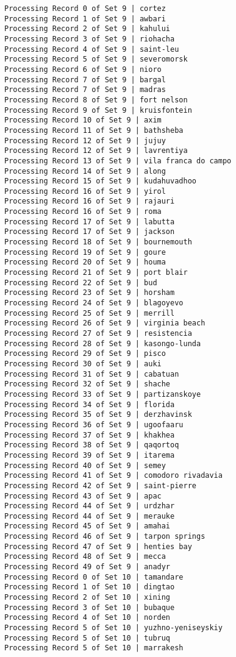 \documentclass[11pt]{article}
\begin{document}
\begin{Verbatim}[commandchars=\\\{\}]
Processing Record 0 of Set 9 | cortez
Processing Record 1 of Set 9 | awbari
Processing Record 2 of Set 9 | kahului
Processing Record 3 of Set 9 | riohacha
Processing Record 4 of Set 9 | saint-leu
Processing Record 5 of Set 9 | severomorsk
Processing Record 6 of Set 9 | nioro
Processing Record 7 of Set 9 | bargal
Processing Record 7 of Set 9 | madras
Processing Record 8 of Set 9 | fort nelson
Processing Record 9 of Set 9 | kruisfontein
Processing Record 10 of Set 9 | axim
Processing Record 11 of Set 9 | bathsheba
Processing Record 12 of Set 9 | jujuy
Processing Record 12 of Set 9 | lavrentiya
Processing Record 13 of Set 9 | vila franca do campo
Processing Record 14 of Set 9 | along
Processing Record 15 of Set 9 | kudahuvadhoo
Processing Record 16 of Set 9 | yirol
Processing Record 16 of Set 9 | rajauri
Processing Record 16 of Set 9 | roma
Processing Record 17 of Set 9 | labutta
Processing Record 17 of Set 9 | jackson
Processing Record 18 of Set 9 | bournemouth
Processing Record 19 of Set 9 | goure
Processing Record 20 of Set 9 | houma
Processing Record 21 of Set 9 | port blair
Processing Record 22 of Set 9 | bud
Processing Record 23 of Set 9 | horsham
Processing Record 24 of Set 9 | blagoyevo
Processing Record 25 of Set 9 | merrill
Processing Record 26 of Set 9 | virginia beach
Processing Record 27 of Set 9 | resistencia
Processing Record 28 of Set 9 | kasongo-lunda
Processing Record 29 of Set 9 | pisco
Processing Record 30 of Set 9 | auki
Processing Record 31 of Set 9 | cabatuan
Processing Record 32 of Set 9 | shache
Processing Record 33 of Set 9 | partizanskoye
Processing Record 34 of Set 9 | florida
Processing Record 35 of Set 9 | derzhavinsk
Processing Record 36 of Set 9 | ugoofaaru
Processing Record 37 of Set 9 | khakhea
Processing Record 38 of Set 9 | qaqortoq
Processing Record 39 of Set 9 | itarema
Processing Record 40 of Set 9 | semey
Processing Record 41 of Set 9 | comodoro rivadavia
Processing Record 42 of Set 9 | saint-pierre
Processing Record 43 of Set 9 | apac
Processing Record 44 of Set 9 | urdzhar
Processing Record 44 of Set 9 | merauke
Processing Record 45 of Set 9 | amahai
Processing Record 46 of Set 9 | tarpon springs
Processing Record 47 of Set 9 | henties bay
Processing Record 48 of Set 9 | mecca
Processing Record 49 of Set 9 | anadyr
Processing Record 0 of Set 10 | tamandare
Processing Record 1 of Set 10 | dingtao
Processing Record 2 of Set 10 | xining
Processing Record 3 of Set 10 | bubaque
Processing Record 4 of Set 10 | norden
Processing Record 5 of Set 10 | yuzhno-yeniseyskiy
Processing Record 5 of Set 10 | tubruq
Processing Record 5 of Set 10 | marrakesh

\end{Verbatim}
\end{document}
